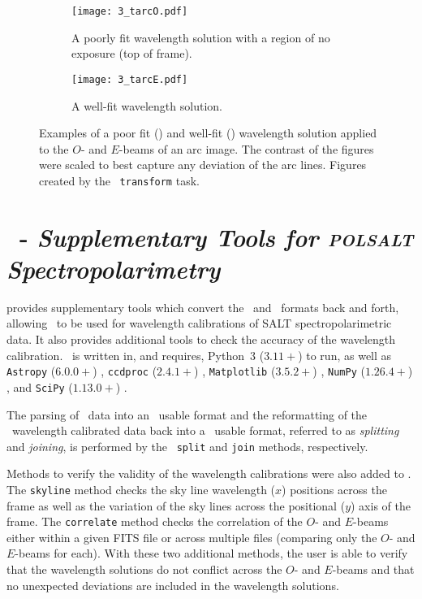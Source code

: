 \begin{figure}[t]
    \centering
    \begin{subfigure}[b]{1.0 \textwidth}
        \centering
        \texttt{[image: 3\_tarcO.pdf]}
        \caption{A poorly fit wavelength solution with a region of no exposure (top of frame).}
        \label{subfig:trans_O}
    \end{subfigure}
    \centering
    \begin{subfigure}[b]{1.0\textwidth}
        \centering
        \texttt{[image: 3\_tarcE.pdf]}
        \caption{A well-fit wavelength solution.}
        \label{subfig:trans_E}
    \end{subfigure}
    \caption{Examples of a poor fit () and well-fit () wavelength solution applied to the $O$- and $E$-beams of an arc image. The contrast of the figures were scaled to best capture any deviation of the arc lines. Figures created by the \iraf\ \texttt{transform} task.}
    \label{fig:iraf_trans_plot}
\end{figure}

\section[\textsc{stops}]{\stops\ - \textit{Supplementary Tools for \textsc{polsalt}\\Spectropolarimetry}} \label{sec:stops}

 provides supplementary tools which convert the \polsalt\ and \iraf\ formats back and forth, allowing \iraf\ to be used for wavelength calibrations of \gls{SALT} spectropolarimetric data. It also provides additional tools to check the accuracy of the wavelength calibration.
\stops\ is written in, and requires, Python~$3$ ($3.11+$) to run, as well as \texttt{Astropy} ($6.0.0+$) \citep{astropy:2013, astropy:2018, astropy:2022}, \texttt{ccdproc} ($2.4.1+$) \citep{ccdproc}, \texttt{Matplotlib} ($3.5.2+$) \citep{matplotlib}, \texttt{NumPy} ($1.26.4+$) \citep{numpy}, and \texttt{SciPy} ($1.13.0+$) \citep{scipy}.

The parsing of \polsalt\ data into an \iraf\ usable format and the reformatting of the \iraf\ wavelength calibrated data back into a \polsalt\ usable format, referred to as \textit{splitting} and \textit{joining}, is performed by the \stops\ \texttt{split} and \texttt{join} methods, respectively.

Methods to verify the validity of the wavelength calibrations were also added to \stops. The \texttt{skyline} method checks the sky line wavelength ($x$) positions across the frame as well as the variation of the sky lines across the positional ($y$) axis of the frame. The \texttt{correlate} method checks the correlation of the $O$- and $E$-beams either within a given \gls{FITS} file or across multiple files (comparing only the $O$- and $E$-beams for each). With these two additional methods, the user is able to verify that the wavelength solutions do not conflict across the $O$- and $E$-beams and that no unexpected deviations are included in the wavelength solutions.

